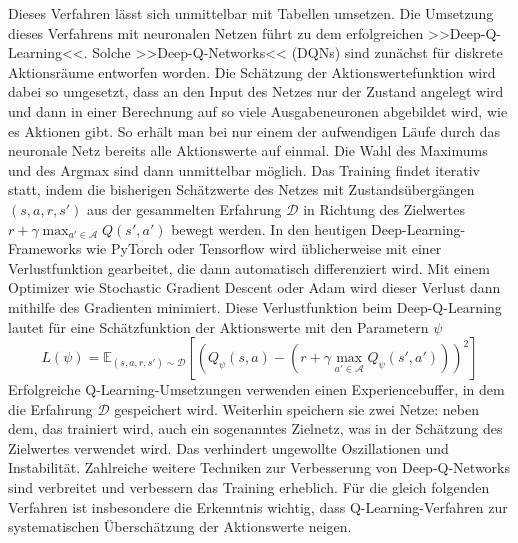 Dieses Verfahren lässt sich unmittelbar mit Tabellen umsetzen.
Die Umsetzung dieses Verfahrens mit neuronalen Netzen führt zu dem erfolgreichen >>Deep-Q-Learning<<.
Solche >>Deep-Q-Networks<< (DQNs) sind zunächst für diskrete Aktionsräume entworfen worden.
Die Schätzung der Aktionswertefunktion wird dabei so umgesetzt, dass an den Input des Netzes nur der Zustand angelegt wird und dann in einer Berechnung auf so viele Ausgabeneuronen abgebildet wird, wie es Aktionen gibt.
So erhält man bei nur einem der aufwendigen Läufe durch das neuronale Netz bereits alle Aktionswerte auf einmal.
Die Wahl des Maximums und des Argmax sind dann unmittelbar möglich.
Das Training findet iterativ statt, indem die bisherigen Schätzwerte des Netzes mit Zustandsübergängen $(s, a, r, s')$ aus der gesammelten Erfahrung $\mathcal{D}$ in Richtung des Zielwertes $r+\gamma \max_{a'\in\mathcal{A}}{Q(s',a')}$ bewegt werden.
In den heutigen Deep-Learning-Frameworks wie PyTorch oder Tensorflow wird üblicherweise mit einer Verlustfunktion gearbeitet, die dann automatisch differenziert wird. \cite{NEURIPS2019_9015}
Mit einem Optimizer wie Stochastic Gradient Descent oder Adam \cite{adam2014} wird dieser Verlust dann mithilfe des Gradienten minimiert.
Diese Verlustfunktion beim Deep-Q-Learning lautet für eine Schätzfunktion der Aktionswerte mit den Parametern $\psi$
\begin{equation}
	L(\psi) = \mathbb{E}_{(s, a, r, s')\sim\mathcal{D}}\left[\left(Q_\psi(s,a)-\left(r+\gamma \max_{a'\in\mathcal{A}}{Q_\psi(s',a')}\right)\right)^2\right]
\end{equation}
Erfolgreiche Q-Learning-Umsetzungen verwenden einen Experiencebuffer, in dem die Erfahrung $\mathcal{D}$ gespeichert wird.
Weiterhin speichern sie zwei Netze: neben dem, das trainiert wird, auch ein sogenanntes Zielnetz, was in der Schätzung des Zielwertes verwendet wird.
Das verhindert ungewollte Oszillationen und Instabilität. \cite{atari2014}
Zahlreiche weitere Techniken zur Verbesserung von Deep-Q-Networks sind verbreitet und verbessern das Training erheblich. \cite{qlearningcomparison2017}
Für die gleich folgenden Verfahren ist insbesondere die Erkenntnis wichtig, dass Q-Learning-Verfahren zur systematischen Überschätzung der Aktionswerte neigen. \cite{qlearningoverestimation}

